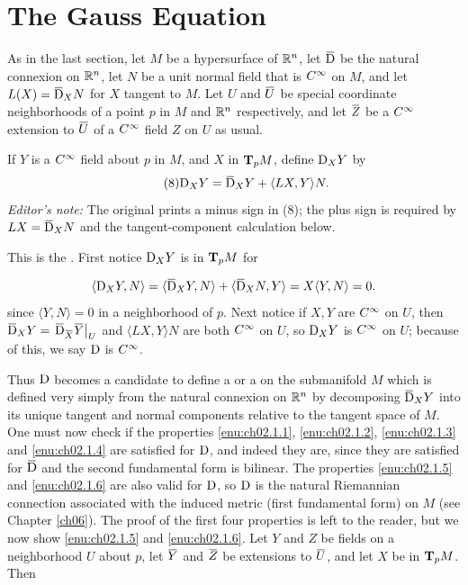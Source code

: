 \documentclass[../main]{subfiles}
\begin{document}
\section{The Gauss Equation}\label{ch02:s3}

As in the last section, let $M$ be a hypersurface of $\bR^{n}$, let $\covariant$ be the natural connexion on $\bR^{n}$, let $N$ be a unit normal field that is $\CInfty$ on $M$, and let $L(X)=\covariant_{X} N$ for $X$ tangent to $M$. Let $U$ and $\xoverline{U}$ be special coordinate neighborhoods of a point $p$ in $M$ and $\bR^{n}$ respectively, and let $\xoverline{Z}$ be a $\CInfty$ extension to $\xoverline{U}$ of a $\CInfty$ field $Z$ on $U$ as usual.

If $Y$ is a $\CInfty$ field about $p$ in $M$, and $X$ in $\tangentspace{M}{p}$, define $\connection_{X} Y$ by
\begin{equation}\tag{8}\label{eqn:ch02.3.8}
  \connection_{X} Y=\covariant_{X} Y+\langle L X, Y\rangle N.
\end{equation}
\noindent\emph{Editor's note:} The original prints a minus sign in (8); the plus sign is required by $L X=\covariant_XN$ and the tangent-component calculation below.



This is the . First notice $\connection_{X} Y$ is in $\tangentspace{M}{p}$ for

\[
\langle \connection_{X} Y, N\rangle=\langle\covariant_{X} Y, N\rangle + \langle\covariant_{X} N, Y\rangle=X\langle Y, N\rangle=0.
\]
since $\langle Y, N\rangle=0$ in a neighborhood of $p$. Next notice if $X, Y$ are $\CInfty$ on $U$, then $\covariant_{X} Y=\left.\covariant_{\xoverline{X}} \xoverline{Y}\right|_{U}$ and $\langle L X, Y\rangle N$ are both $\CInfty$ on $U$, so $\connection_{X} Y$ is $\CInfty$ on $U$; because of this, we say $\connection$ is $\CInfty$.

Thus $\connection$ becomes a candidate to define a  or a  on the submanifold $M$ which is defined very simply from the natural connexion on $\bR^{n}$ by decomposing $\covariant_{X} Y$ into its unique tangent and normal components relative to the tangent space of $M$. One must now check if the properties \ref{enu:ch02.1.1}, \ref{enu:ch02.1.2}, \ref{enu:ch02.1.3} and \ref{enu:ch02.1.4} are satisfied for $\connection$, and indeed they are, since they are satisfied for $\covariant$ and the second fundamental form is bilinear. The properties \ref{enu:ch02.1.5} and \ref{enu:ch02.1.6} are also valid for $\connection$, so $\connection$ is the natural Riemannian connection associated with the induced metric (first fundamental form) on $M$ (see Chapter \ref{ch06}). The proof of the first four properties is left to the reader, but we now show \ref{enu:ch02.1.5} and \ref{enu:ch02.1.6}. Let $Y$ and $Z$ be fields on a neighborhood $U$ about $p$, let $\xoverline{Y}$ and $\xoverline{Z}$ be extensions to $\xoverline{U}$, and let $X$ be in $\tangentspace{M}{p}$. Then
\end{document}
